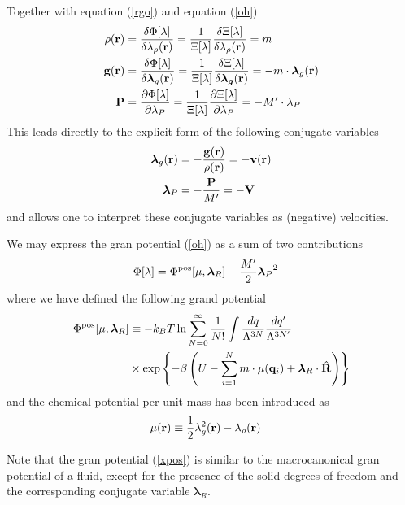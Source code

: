 \documentclass[b5paper,openright,10pt]{book}
\begin{document}
Together with equation (\ref{rgo}) and equation (\ref{oh})
\begin{align}
  \rho({\bf r}) &=\frac{\delta \Phi [\lambda]}{\delta \lambda_\rho({\bf r}) } = \frac{1}{\Xi[\lambda]} \frac{\delta\Xi [\lambda]}{\delta \lambda_{\rho}({\bf r})} = m
  \nonumber\\
  {\bf g}({\bf r}) &=\frac{\delta \Phi [\lambda]}{\delta \boldsymbol{\lambda}_g({\bf r}) } =\frac{1}{\Xi[\lambda]} \frac{\delta\Xi [\lambda]}{\delta \boldsymbol{\lambda_g}({\bf r})} = -m\cdot\boldsymbol{\lambda}_g({\bf r})
 \nonumber\\
 {\bf P} &=\frac{\partial \Phi [\lambda]}{\partial \lambda_P} =\frac{1}{\Xi[\lambda]} \frac{\partial\Xi [\lambda]}{\partial \lambda_P} = -M'\cdot\lambda_P
\end{align}
This leads directly to the explicit form of the following conjugate variables
\begin{align}
 \boldsymbol{\lambda}_g({\bf r}) &= -\frac{{\bf g}({\bf r})}{\rho({\bf r})}=-{\bf v}({\bf r})
\nonumber\\
\boldsymbol{\lambda}_P &= -\frac{{\bf P}}{M'} = -{\bf V}
\label{nu}
\end{align}
and allows  one to interpret  these conjugate variables  as (negative)
velocities.  


We may express the gran potential (\ref{oh}) as a sum of two contributions
\begin{align}
\Phi [\lambda]&=  \Phi^{\rm pos}[\mu,\boldsymbol{\lambda}_R]
-\frac{M'}{2} {\boldsymbol{\lambda}_P}^2
\label{xpos1}
\end{align}
where we have defined the following grand potential
\begin{align}
\Phi^{\rm pos}[\mu,\boldsymbol{\lambda}_R]
&\equiv-k_BT\ln
 \sum_{N=0}^\infty \frac{1}{N!}
\int \frac{dq}{\Lambda^{3N}}\frac{dq'}{\Lambda^{3N'}}\nonumber\\
&\times
\exp\left\{-\beta  \left(U-\sum_{i=1}^N m\cdot\mu({\bf
    q}_i)+ \boldsymbol{\lambda}_R\cdot\hat{\bf R}\right)\right\}
\label{xpos}
\end{align}
and the chemical potential per unit mass has been introduced as
\begin{align}
  \mu({\bf r})&\equiv\frac{1}{2}\lambda_g^2({\bf r})-\lambda_\rho({\bf r})
\label{chempot}
\end{align}

Note that the gran potential (\ref{xpos}) is similar to the macrocanonical gran potential of a fluid, except for the presence of the solid degrees of freedom and the corresponding conjugate variable $\boldsymbol{\lambda}_R$. 
\end{document}
